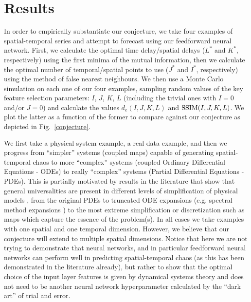 \documentclass[journal]{IEEEtran}
\begin{document}

\section{Results}
\label{resultssection}

In order to empirically substantiate our conjecture, we take four examples of spatial-temporal series and attempt
to forecast using our feedforward neural network. 
First, we calculate the optimal time delay/spatial delays ($L^*$ and $K^*$, respectively)
using the first minima of the mutual information, then we calculate the optimal number of temporal/spatial points to use
($J^*$ and $I^*$, respectively) using the method of false nearest neighbours.
We then use a Monte Carlo simulation on each one of our four examples, sampling random values
of the key feature selection parameters: $I$, $J$, $K$, $L$ (including the trivial ones with $I=0$ and/or $J=0$) 
and calculate the values $d_e(I,J,K,L)$ 
and $\textnormal{SSIM}(I,J,K,L)$.
We plot the latter as a function of the former to compare against our conjecture as depicted in Fig.\ \ref{conjecture}.

We first take a physical system example, a real data example, and then we progress from ``simpler'' systems (coupled maps) 
capable of generating 
spatial-temporal chaos to more ``complex'' systems (coupled Ordinary Differential Equations - ODEs) to really ``complex'' systems (Partial 
Differential Equations - PDEs). This is partially motivated by results in the literature that show that general universalities are 
present in different levels of simplification of physical models \cite{2001Chaos..11..404C}, 
from the original PDEs to truncated ODE expansions (e.g. spectral 
method expansions \cite{2001cfsm.book.....B}) to the most extreme simplification or discretization such as maps 
which capture the essence of the problem(s). In all cases we take examples with one spatial and one temporal dimension. 
However, we believe 
that our conjecture will extend to multiple spatial dimensions. Notice that here we are not trying to demonstrate
that neural networks, and in particular feedforward neural networks can perform well in predicting spatial-temporal chaos
(as this has been demonstrated in the literature already), but 
rather to show that the optimal choice of the input layer features is given by dynamical systems theory and does not need to be
another neural network hyperparameter calculated by the ``dark art'' of trial and error.
\end{document}
